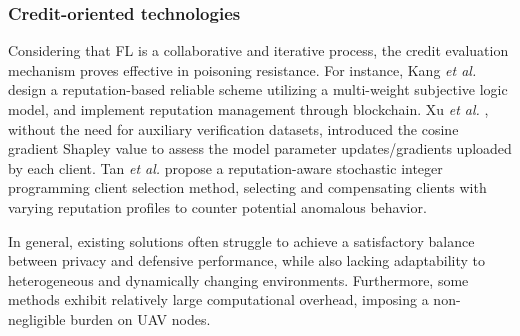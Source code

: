 \documentclass[lettersize,journal]{IEEEtran}
\begin{document}
\subsubsection{Credit-oriented technologies} 
Considering that FL is a collaborative and iterative process, the credit evaluation mechanism proves effective in poisoning resistance. For instance, Kang \textit{et al.} \cite{credit1-kang2019IOT} design a reputation-based reliable scheme utilizing a multi-weight subjective logic model, and implement reputation management through blockchain. Xu \textit{et al.} \cite{xu2020reputation, xu2021gradient}, without the need for auxiliary verification datasets, introduced the cosine gradient Shapley value to assess the model parameter updates/gradients uploaded by each client. Tan \textit{et al.} \cite{tan2022reputation} propose a reputation-aware stochastic integer programming client selection method, selecting and compensating clients with varying reputation profiles to counter potential anomalous behavior.




In general, existing solutions often struggle to achieve a satisfactory balance between privacy and defensive performance, while also lacking adaptability to heterogeneous and dynamically changing environments. Furthermore, some methods exhibit relatively large computational overhead, imposing a non-negligible burden on UAV nodes.
\end{document}
